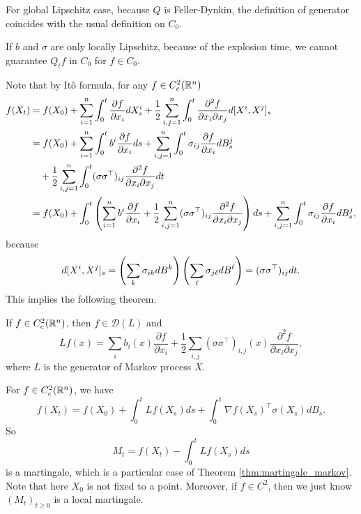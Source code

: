 \begin{rmk}
    For global Lipschitz case, because $Q$ is Feller-Dynkin, the definition of generator coincides with the usual definition on $C_0$.
\end{rmk}
\begin{rmk}
    If $b$ and $\sigma$ are only locally Lipschitz, because of the explosion time, we cannot guarantee $Q_t f$ in $C_0$ for $f \in C_0$.
\end{rmk}

Note that by It\^o formula, for any $f \in C_c^2(\mathbb{R}^n)$
\begin{align*}
    f(X_t) &= f(X_0) + \sum_{i=1}^n\int_0^t \frac{\partial f}{\partial x_i}dX^i_s + \frac{1}{2} \sum_{i,j=1}^n \int_0^t\frac{\partial^2 f}{\partial x_i \partial x_j}d[X^i,X^j]_s \\
    &= f(X_0) + \sum_{i=1}^n\int_0^t b^i\frac{\partial f}{\partial x_i}ds + \sum_{i,j=1}^n\int_0^t \sigma_{ij} \frac{\partial f}{\partial x_i}dB^j_s \\
    &\quad + \frac{1}{2} \sum_{i,j=1}^n \int_0^t (\sigma \sigma^\top)_{ij} \frac{\partial^2 f}{\partial x_i \partial x_j} dt \\
    &= f(X_0) + \int_0^t \left( \sum_{i=1}^n b^i\frac{\partial f}{\partial x_i} + \frac{1}{2} \sum_{i,j=1}^n (\sigma \sigma^\top)_{ij} \frac{\partial^2 f}{\partial x_i \partial x_j} \right)ds + \sum_{i,j=1}^n\int_0^t \sigma_{ij} \frac{\partial f}{\partial x_i}dB^j_s,
\end{align*}
because
\begin{equation*}
    d[X^i,X^j]_s = \left(\sum_k \sigma_{ik}dB^k\right)\left(\sum_\ell \sigma_{j\ell}dB^\ell\right) = (\sigma \sigma^\top)_{ij}dt.
\end{equation*}
This implies the following theorem.

\begin{thm}
    If $f \in C_c^2(\mathbb{R}^n)$, then $f \in \mathcal{D}(L)$ and
    \begin{equation*}
        Lf(x) = \sum_i b_i(x) \frac{\partial f}{\partial x_i}+\frac{1}{2} \sum_{i, j}\left(\sigma \sigma^\top\right)_{i, j}(x) \frac{\partial^2 f}{\partial x_i \partial x_j},
    \end{equation*}
    where $L$ is the generator of Markov process $X$.
\end{thm}

\noindent For $f \in C_c^2(\mathbb{R}^n)$, we have
\begin{equation*}
    f(X_t) = f(X_0) + \int_0^t Lf(X_s)ds + \int_0^t \nabla f(X_s)^\top \sigma (X_s) dB_s.
\end{equation*}
So
\begin{equation*}
    M_t = f(X_t) - \int_0^t Lf(X_s)ds
\end{equation*}
is a martingale, which is a particular case of Theorem \ref{thm:martingale_markov}. Note that here $X_0$ is not fixed to a point. Moreover, if $f \in C^2$, then we just know $(M_t)_{t \geq 0}$ is a local martingale.

